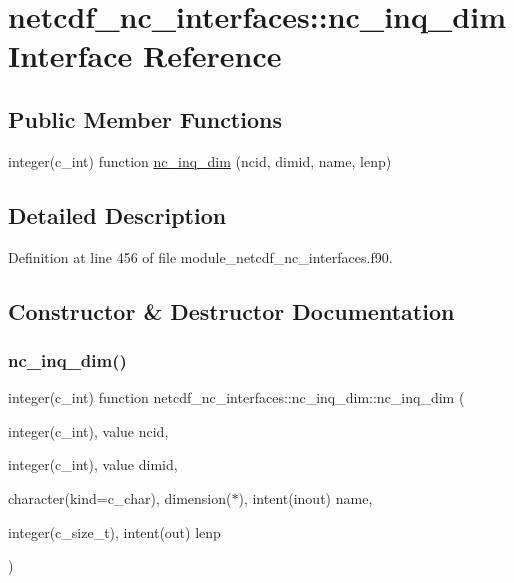 \hypertarget{interfacenetcdf__nc__interfaces_1_1nc__inq__dim}{}\section{netcdf\+\_\+nc\+\_\+interfaces\+:\+:nc\+\_\+inq\+\_\+dim Interface Reference}
\label{interfacenetcdf__nc__interfaces_1_1nc__inq__dim}
\subsection*{Public Member Functions}
\begin{DoxyCompactItemize}
\item 
integer(c\+\_\+int) function \hyperlink{interfacenetcdf__nc__interfaces_1_1nc__inq__dim_a5fdab9dba96294880fd951310bf78527}{nc\+\_\+inq\+\_\+dim} (ncid, dimid, name, lenp)
\end{DoxyCompactItemize}


\subsection{Detailed Description}


Definition at line 456 of file module\+\_\+netcdf\+\_\+nc\+\_\+interfaces.\+f90.



\subsection{Constructor \& Destructor Documentation}
\mbox{\label{interfacenetcdf__nc__interfaces_1_1nc__inq__dim_a5fdab9dba96294880fd951310bf78527}} 
\subsubsection{\texorpdfstring{nc\+\_\+inq\+\_\+dim()}{nc\_inq\_dim()}}
{\footnotesize\ttfamily integer(c\+\_\+int) function netcdf\+\_\+nc\+\_\+interfaces\+::nc\+\_\+inq\+\_\+dim\+::nc\+\_\+inq\+\_\+dim (\begin{DoxyParamCaption}\item[{integer(c\+\_\+int), value}]{ncid,  }\item[{integer(c\+\_\+int), value}]{dimid,  }\item[{character(kind=c\+\_\+char), dimension($\ast$), intent(inout)}]{name,  }\item[{integer(c\+\_\+size\+\_\+t), intent(out)}]{lenp }\end{DoxyParamCaption})}



